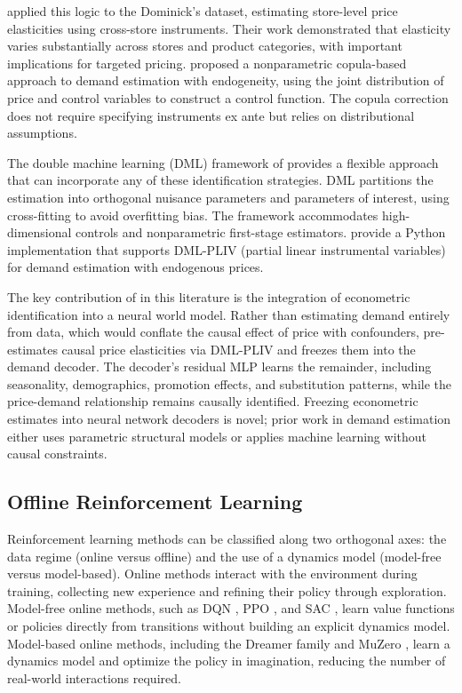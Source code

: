 \citet{hoch1995determinants} applied this logic to the Dominick's dataset, estimating store-level price elasticities using cross-store instruments. Their work demonstrated that elasticity varies substantially across stores and product categories, with important implications for targeted pricing. \citet{park2010copula} proposed a nonparametric copula-based approach to demand estimation with endogeneity, using the joint distribution of price and control variables to construct a control function. The copula correction does not require specifying instruments ex ante but relies on distributional assumptions.

The double machine learning (DML) framework of \citet{chernozhukov2018dml} provides a flexible approach that can incorporate any of these identification strategies. DML partitions the estimation into orthogonal nuisance parameters and parameters of interest, using cross-fitting to avoid overfitting bias. The framework accommodates high-dimensional controls and nonparametric first-stage estimators. \citet{bach2022doubleml} provide a Python implementation that supports DML-PLIV (partial linear instrumental variables) for demand estimation with endogenous prices.

The key contribution of \dreamprice{} in this literature is the integration of econometric identification into a neural world model. Rather than estimating demand entirely from data, which would conflate the causal effect of price with confounders, \dreamprice{} pre-estimates causal price elasticities via DML-PLIV and freezes them into the demand decoder. The decoder's residual MLP learns the remainder, including seasonality, demographics, promotion effects, and substitution patterns, while the price-demand relationship remains causally identified. Freezing econometric estimates into neural network decoders is novel; prior work in demand estimation either uses parametric structural models or applies machine learning without causal constraints.

\subsection{Offline Reinforcement Learning}

Reinforcement learning methods can be classified along two orthogonal axes: the data regime (online versus offline) and the use of a dynamics model (model-free versus model-based). Online methods interact with the environment during training, collecting new experience and refining their policy through exploration. Model-free online methods, such as DQN \citep{mnih2015dqn}, PPO \citep{schulman2017ppo}, and SAC \citep{haarnoja2018sac}, learn value functions or policies directly from transitions without building an explicit dynamics model. Model-based online methods, including the Dreamer family \citep{hafner2023dreamerv3} and MuZero \citep{schrittwieser2020muzero}, learn a dynamics model and optimize the policy in imagination, reducing the number of real-world interactions required.

